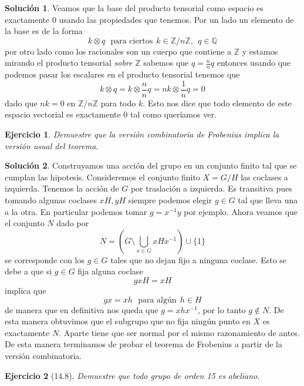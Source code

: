 \documentclass[11pt]{article}
\theoremstyle{plain}
\newtheorem*{ej}{Ejercicio}
\theoremstyle{definition}
\newtheorem*{sol}{Solución}
\theoremstyle{remark}
\newcommand\ZZ{\mathbb{Z}}
\begin{document}
\begin{sol}
	Veamos que la base del producto tensorial como espacio es exactamente $0$ usando las propiedades que tenemos. Por un lado un elemento de la base es de la forma
	\[
	k \otimes q \ \ \ \text{para ciertos} \ \ k \in \ZZ/n\ZZ, \ \ q \in \mathbb Q
	\]
	por otro lado como los racionales son un cuerpo que contiene a $\ZZ$ y estamos mirando el producto tensorial \textit{sobre} $\ZZ$ sabemos que $q = \frac{n}{n}q$ entonces usando que podemos pasar los escalares en el producto tensorial tenemos que 
	\[
	k \otimes q = k \otimes \frac{n}{n} q = nk \otimes \frac{1}{n}q = 0
	\]
	dado que $nk = 0$ en $\ZZ/n\ZZ$ para todo $k$. Esto nos dice que todo elemento de este espacio vectorial es exactamente 0 tal como queríamos ver.
\end{sol}

\newpage
\begin{tcolorbox}[colback=teal!25!white,colframe=teal!75!black]
	\begin{ej}
		Demuestre que la versión combinatoria de Frobenius implica la versión usual del teorema.		
	\end{ej}	
\end{tcolorbox}
\medskip

\begin{sol}
Construyamos una acción del grupo en un conjunto finito tal que se cumplan las hipotesis. Consideremos el conjunto finito $X = G/H$ las coclases a izquierda. Tenemos la acción de $G$ por traslación a izquierda. Es transitiva pues tomando algunas coclases $xH, yH$ siempre podemos elegir $g \in G$ tal que lleva una a la otra. En particular podemos tomar $g=x^{-1}y$ por ejemplo. Ahora veamos que el conjunto $N$ dado por 
\[
N = (G \setminus \bigcup_{x \in G} xHx^{-1}) \cup \{1\}
\]
se corresponde con los $g \in G$ tales que no dejan fijo a ninguna coclase. Esto se debe a que si $g \in G$ fija alguna coclase
\[
gxH = xH
\]
implica que
\[
gx = xh \ \ \ \text{para algún} \ \ h \in H
\]
de manera que en definitiva nos queda que $g = xhx^{-1}$, por lo tanto $g \notin N$. De esta manera obtuvimos que el subgrupo que no fija ningún punto en $X$ es exactamente $N$. Aparte tiene que ser normal por el mismo razonamiento de antes. De esta manera terminamos de probar el teorema de Frobenius a partir de la versión combinatoria.
\end{sol}
\bigskip
\begin{tcolorbox}[colback=teal!25!white,colframe=teal!75!black]
	\begin{ej}[14.8]
		Demuestre que todo grupo de orden 15 es abeliano.
	\end{ej}	
\end{tcolorbox}
\medskip
\end{document}
